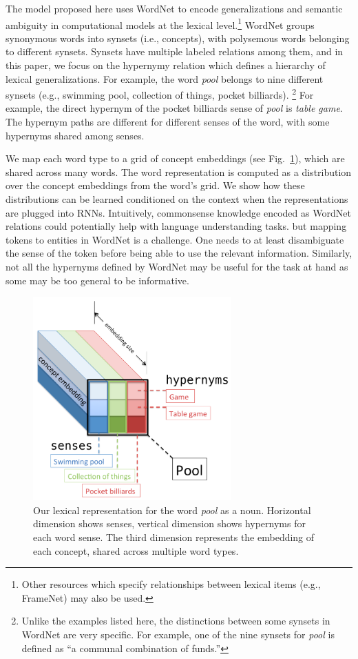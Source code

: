 The model proposed here uses WordNet \citep{miller1995wordnet} to encode generalizations and semantic ambiguity in computational models at the lexical level.\footnote{Other resources which specify relationships between lexical items (e.g., FrameNet) may also be used.}
WordNet groups synonymous words into synsets (i.e., concepts), with polysemous words belonging to different synsets. Synsets have multiple labeled relations among them, and in this paper, we focus on the hypernymy relation which defines a hierarchy of lexical generalizations.
For example, the word \textit{pool} belongs to nine different synsets (e.g., swimming pool, collection of things, pocket billiards).
\footnote{Unlike the examples listed here, the distinctions between some synsets in WordNet are very specific. For example, one of the nine synsets for \textit{pool} is defined as ``a communal combination of funds.''}
For example, the direct hypernym of the pocket billiards sense of \textit{pool} is \textit{table game}.
The hypernym paths are different for different senses of the word, with some hypernyms shared among senses.

We map each word type to a grid of concept embeddings (see Fig.~\ref{fig:ontolstm_tensor}), which are shared across many words. The word representation is computed as a distribution over the concept embeddings from the word's grid. We show how these distributions can be 
learned conditioned on the context when the representations are plugged into RNNs.
Intuitively, commonsense knowledge encoded as WordNet relations could potentially help with language understanding tasks. 
but mapping tokens to entities in WordNet is a challenge. One needs to at least disambiguate the sense of the token before being able to use the relevant information. Similarly, not all the hypernyms defined by WordNet may be useful for the task at hand as some may be too general to be informative.
 
\begin{figure}[t]
\begin{center}
\includegraphics[width=3in]{figures/tensor2.png}
\caption{Our lexical representation for the word \textit{pool} as a noun.
Horizontal dimension shows senses, vertical dimension shows hypernyms for each word sense.
The third dimension represents the embedding of each concept, shared across multiple word types.
}
\label{fig:ontolstm_tensor}
\end{center}
\end{figure}

